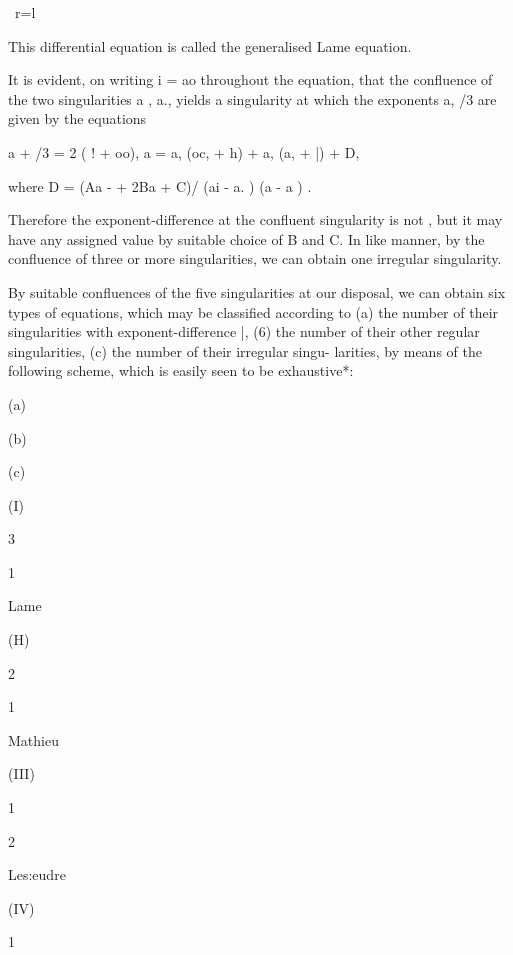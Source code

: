 \ r=l






This differential equation is called the generalised Lame equation.

It is evident, on writing i = ao throughout the equation, that the
confluence of the two singularities a , a., yields a singularity at
which the exponents a, /3 are given by the equations

a + /3 = 2 ( ! + oo), a = a, (oc, + h) + a, (a, + |) + D,

where D = (Aa - + 2Ba + C)/ (ai - a. ) (a - a ) .

Therefore the exponent-difference at the confluent singularity is not
, but it may have any assigned value by suitable choice of B and C. In
like manner, by the confluence of three or more singularities, we can
obtain one irregular singularity.

By suitable confluences of the five singularities at our disposal, we
can obtain six types of equations, which may be classified according
to (a) the number of their singularities with exponent-difference |,
(6) the number of their other regular singularities, (c) the number of
their irregular singu- larities, by means of the following scheme,
which is easily seen to be exhaustive*:





(a)


(b)


(c)




(I)


3


1





Lame


(H)


2





1


Mathieu


(III)


1


2





Les:eudre


(IV)





1



